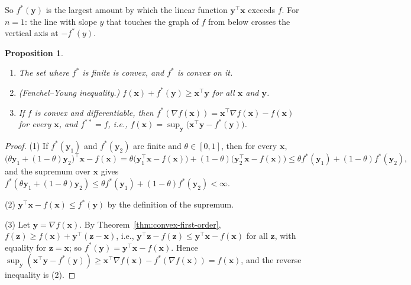 \documentclass[11pt]{article}
\theoremstyle{definition}
\theoremstyle{plain}
\newtheorem{proposition}[definition]{Proposition}
\theoremstyle{remark}
\begin{document}
So $f^*(\mathbf{y})$ is the largest amount by which the linear function $\mathbf{y}^\top\mathbf{x}$ exceeds $f$. For $n = 1$: the line with slope $y$ that touches the graph of $f$ from below crosses the vertical axis at $-f^*(y)$.

\begin{proposition}\label{prop:conjugate}
    \begin{enumerate}
        \item The set where $f^*$ is finite is convex, and $f^*$ is convex on it.
        \item (Fenchel--Young inequality.) $f(\mathbf{x}) + f^*(\mathbf{y}) \geq \mathbf{x}^\top\mathbf{y}$ for all $\mathbf{x}$ and $\mathbf{y}$.
        \item If $f$ is convex and differentiable, then $f^*(\nabla f(\mathbf{x})) = \mathbf{x}^\top\nabla f(\mathbf{x}) - f(\mathbf{x})$ for every $\mathbf{x}$, and $f^{**} = f$, i.e., $f(\mathbf{x}) = \sup_{\mathbf{y}}\big(\mathbf{x}^\top\mathbf{y} - f^*(\mathbf{y})\big)$.
    \end{enumerate}
\end{proposition}

\begin{proof}
    (1) If $f^*(\mathbf{y}_1)$ and $f^*(\mathbf{y}_2)$ are finite and $\theta \in [0, 1]$, then for every $\mathbf{x}$,
    \[\big(\theta\mathbf{y}_1 + (1 - \theta)\mathbf{y}_2\big)^\top\mathbf{x} - f(\mathbf{x}) = \theta\big(\mathbf{y}_1^\top\mathbf{x} - f(\mathbf{x})\big) + (1 - \theta)\big(\mathbf{y}_2^\top\mathbf{x} - f(\mathbf{x})\big) \leq \theta f^*(\mathbf{y}_1) + (1 - \theta)f^*(\mathbf{y}_2),\]
    and the supremum over $\mathbf{x}$ gives $f^*(\theta\mathbf{y}_1 + (1 - \theta)\mathbf{y}_2) \leq \theta f^*(\mathbf{y}_1) + (1 - \theta)f^*(\mathbf{y}_2) < \infty$.

    (2) $\mathbf{y}^\top\mathbf{x} - f(\mathbf{x}) \leq f^*(\mathbf{y})$ by the definition of the supremum.

    (3) Let $\mathbf{y} = \nabla f(\mathbf{x})$. By Theorem~\ref{thm:convex-first-order}, $f(\mathbf{z}) \geq f(\mathbf{x}) + \mathbf{y}^\top(\mathbf{z} - \mathbf{x})$, i.e., $\mathbf{y}^\top\mathbf{z} - f(\mathbf{z}) \leq \mathbf{y}^\top\mathbf{x} - f(\mathbf{x})$ for all $\mathbf{z}$, with equality for $\mathbf{z} = \mathbf{x}$; so $f^*(\mathbf{y}) = \mathbf{y}^\top\mathbf{x} - f(\mathbf{x})$. Hence $\sup_{\mathbf{y}}(\mathbf{x}^\top\mathbf{y} - f^*(\mathbf{y})) \geq \mathbf{x}^\top\nabla f(\mathbf{x}) - f^*(\nabla f(\mathbf{x})) = f(\mathbf{x})$, and the reverse inequality is (2).
\end{proof}
\end{document}
